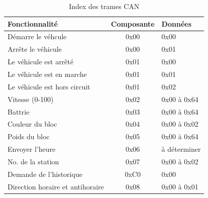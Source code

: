 \documentclass[10pt,a4paper,final]{article}
\begin{document}
\begin{spacing}{1.5}
\begin{table}[!ht]
\caption{Index des trames CAN}
\medskip
\centering
\begin{tabular}{|l|c|l|}
\hline 
\textbf{Fonctionnalité} & \textbf{Composante} & \textbf{Données} \\
\hline 
Démarre le véhcule & 0x00 & 0x00 \\ 
\hline 
Arrête le véhicule & 0x00 & 0x01 \\ 
\hline 
Le véhicule est arrêté & 0x01 & 0x00 \\ 
\hline 
Le véhicule est en marche& 0x01 & 0x01 \\ 
\hline 
Le véhicule est hors circuit & 0x01 & 0x02 \\ 
\hline 
Vitesse (0-100) & 0x02 & 0x00 à 0x64 \\ 
\hline 
Battrie & 0x03 & 0x00 à 0x64 \\ 
\hline 
Couleur du bloc & 0x04 & 0x00 à 0x02 \\ 
\hline 
Poids du bloc & 0x05 & 0x00 à 0x64 \\ 
\hline 
Envoyer l'heure & 0x06 & à déterminer \\ 
\hline 
No. de la station & 0x07 & 0x00 à 0x02 \\ 
\hline 
Demande de l'historique & 0xC0 & 0x00 \\ 
\hline 
Direction horaire et antihoraire & 0x08 & 0x00 à 0x01 \\
\hline
\end{tabular} 
\label{tab:testtab1}
\end{table}


\end{spacing}
\end{document}
